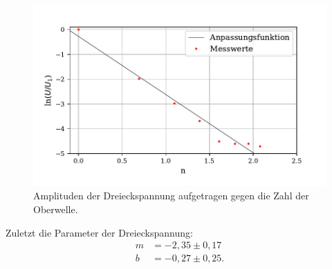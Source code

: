 \begin{figure}
  \centering
  \includegraphics{plot3.pdf}
  \caption{Amplituden der Dreieckspannung aufgetragen gegen die Zahl der Oberwelle.}
  \label{fig:rechteck}
\end{figure}
Zuletzt die Parameter der Dreieckspannung:
\begin{align*}
  m &= -2,35 \pm 0,17 \\
  b &= -0,27 \pm 0,25 .
\end{align*}


